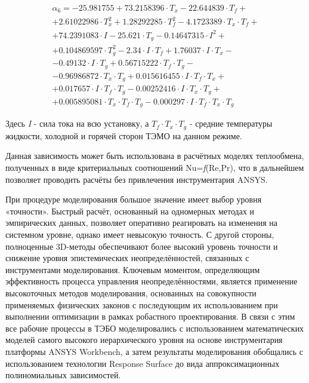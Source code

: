 \[
	\begin{array}{l}
		\alpha _{6} =-25.981755+73.2158396\cdot T_{x} -22.644839\cdot T_{f}+
		\\+
		2.61022986\cdot T_{x}^{2} + 1.28292285\cdot T_{f}^{2} -4.1723389\cdot T_{x} \cdot T_{f} +
		\\+
		74.2391083\cdot I-25.621\cdot T_{g} -0.14647315\cdot I^{2} +
		\\+
		0.104869597\cdot T_{g}^{2} -2.34\cdot I\cdot T_{f} +
		1.76037\cdot I\cdot T_{x} -
		\\-
		0.49132\cdot I\cdot T_{g} +
		0.56715222\cdot T_{f} \cdot T_{g} -
		\\-
		0.96986872\cdot T_{x} \cdot T_{g} +
		0.015616455\cdot I\cdot T_{f} \cdot T_{x} +
		\\+
		0.017657\cdot I\cdot T_{f} \cdot T_{g} -
		0.00252416\cdot I\cdot T_{x} \cdot T_{g} +
		\\+
		0.005895081\cdot T_{x} \cdot T_{f} \cdot T_{g} -
		0.000297\cdot I\cdot T_{f} \cdot T_{x} \cdot T_{g}
	\end{array}
\]

Здесь \textit{I} - сила тока на всю установку, а $T_{f} \cdot T_{x} \cdot T_{g} $ - средние температуры жидкости, холодной и горячей сторон ТЭМО на данном режиме.

Данная зависимость может быть использована в расчётных моделях теплообмена,
полученных в виде критериальных соотношений Nu=\textit{f}(Re,Pr),
что в дальнейшем позволяет проводить расчёты без привлечения инструментария ANSYS.

При процедуре моделирования большое значение имеет выбор уровня «точности». Быстрый расчёт, основанный на одномерных методах и эмпирических данных, позволяет оперативно реагировать на изменения на системном уровне, однако имеет невысокую точность. С другой стороны, полноценные 3D-методы обеспечивают более высокий уровень точности и снижение уровня эпистемических неопределённостей, связанных с инструментами моделирования. Ключевым моментом, определяющим эффективность процесса управления неопределённостями, является применение высокоточных методов моделирования, основанных на совокупности применяемых физических законов с последующим их использованием при выполнении оптимизации в рамках робастного проектирования. В связи с этим все рабочие процессы в ТЭБО моделировались с использованием математических моделей самого высокого иерархического уровня на основе инструментария платформы ANSYS Workbench, а затем результаты моделирования обобщались с использованием технологии Response Surface до вида аппроксимационных полиномиальных зависимостей.

